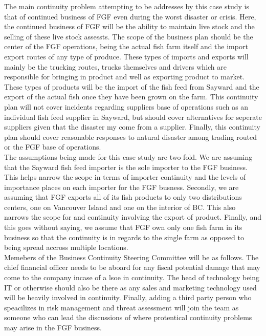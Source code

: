 \documentclass[paper=a4, fontsize=11pt]{scrartcl} %
\numberwithin{equation}{section} %
\numberwithin{figure}{section} %
\numberwithin{table}{section} %
\begin{document}
The main continuity problem attempting to be addresses by this case study is that of
continued business of FGF even during the worst disaster or crisis. Here, the continued
business of FGF will be the ability to maintain live stock and the selling of these live
stock assessts. The scope of the business plan should be the center of the FGF operations,
being the actual fish farm itself and the import export routes of any type of produce.
These types of imports and exports will mainly be the trucking routes, trucks themselves
and drivers which are responsible for bringing in product and well as exporting product
to market. These types of products will be the import of the fish feed from Sayward and
the export of the actual fish once they have been grown on the farm. This continuity
plan will not cover incidents regarding suppliers base of operations such as an individual
fish feed supplier in Sayward, but should cover alternatives for seperate suppliers
given that the disaster my come from a supplier. Finally, this continuity plan should
cover reasonable responses to natural disaster among trading routed or the FGF base of
operations.\\

The assumptions being made for this case study are two fold. We are assuming that the 
Sayward fish feed importer is the sole importer to the FGF business. This helps narrow
the scope in terms of importer continuity and the levels of importance places on each
importer for the FGF busness. Secondly, we are assuming that FGF exports all of its
fish products to only two distributions centers, one on Vancouver Island and one
on the interior of BC. This also narrows the scope for and continuity involving the 
export of product. Finally, and this goes without saying, we assume that FGF own only
one fish farm in its business so that the continuity is in regards to the single farm
as opposed to being spread accross multiple locations.\\

Memebers of the Business Continuity Steering Committee will be as follows. The chief
financial officer needs to be aboard for any fiscal potential damage that may come to
the company incase of a lsoe in continuity. The head of technology being IT or otherwise
should also be there as any sales and marketing technology used will be heavily involved
in continuity. Finally, adding a third party person who speacilizes in risk management
and threat assessment will join the team as someone who can lead the discussions of
where protentical continuity problems may arise in the FGF business.\\
\end{document}
